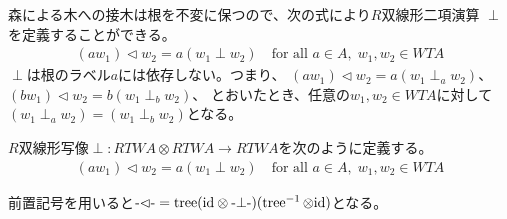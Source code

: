 	森による木への接木は根を不変に保つので、次の式により$R$双線形二項演算
	$\perp$を定義することができる。
	\begin{equation}\label{eq:接木による森の二項演算の定義}\begin{split} %
		(aw_1)\lhd w_2 = a(w_1\perp w_2)\quad\text{for all }a\in A,\;w_1,w_2\in WTA
	\end{split}\end{equation} %
	$\perp$は根のラベル$a$には依存しない。つまり、
	$(aw_1)\lhd w_2=a(w_1\perp_aw_2)$、$(bw_1)\lhd w_2=b(w_1\perp_bw_2)$、
	とおいたとき、任意の$w_1,w_2\in WTA$に対して
	$(w_1\perp_aw_2)=(w_1\perp_bw_2)$となる。

	\begin{definition}[接木による森の二項演算]\label{def:接木による森の二項演算} %
		$R$双線形写像$\perp:RTWA\otimes RTWA\to RTWA$を次のように定義する。
		\begin{equation}\begin{split} %
			(aw_1)\lhd w_2 = a(w_1\perp w_2)\quad\text{for all }a\in A,\;w_1,w_2\in WTA
		\end{split}\end{equation} %
	\end{definition} %

	前置記号を用いると$
	\mybiop{\lhd}=\myop{tree}(\myid\otimes\mybiop{\perp})
	(\myop{tree}^{-1}\otimes\myid)
	$となる。

